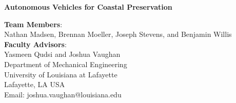 \documentclass[12 pt]{article}
\begin{document}
\begin{center}
{\LARGE \bf Autonomous Vehicles for Coastal Preservation}

\textbf{Team Members}:\\Nathan Madsen, Brennan Moeller, Joseph Stevens, and Benjamin Willis\\
\vspace{0.1in}
\textbf{Faculty Advisors}:\\Yasmeen Qudsi and Joshua Vaughan \\

\vspace{0.1in}
\footnotesize{Department of Mechanical Engineering\\
University of Louisiana at Lafayette\\
Lafayette, LA USA\\
Email: joshua.vaughan@louisiana.edu}
\end{center}



\pagestyle{plain}
\cfoot{\thepage}

\begin{abstract}
\vspace{-0.2in}
This work proposed here seeks to improve the safety and efficiency of autonomous surface vessels used to monitor wetlands through the addition of an OAK-D cameras. The OAK-D would would be increase the efficiency of the autonomous system by reducing the computational load on the on-board computers, thereby increasing the computational power available for both the scientific mission on the boat. This addition would also help improve the localization precision the surface vessel by enabling more sensors, such as LiDAR, to be added with the same computational resources and power requirements.
\end{abstract}

\end{document}
